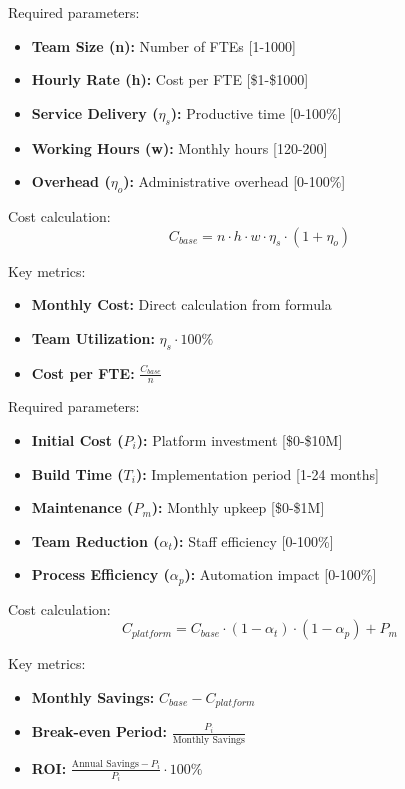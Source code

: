 \documentclass[12pt,a4paper]{article}
\newenvironment{definition}[1]
{\begin{mdframed}[style=definitionstyle,frametitle={Definition: #1}]}
{\end{mdframed}}
\begin{document}
\begin{definition}{Base Team Model Inputs}
Required parameters:
\begin{itemize}
    \item \textbf{Team Size (n):} Number of FTEs [1-1000]
    \item \textbf{Hourly Rate (h):} Cost per FTE [\$1-\$1000]
    \item \textbf{Service Delivery ($\eta_s$):} Productive time [0-100\%]
    \item \textbf{Working Hours (w):} Monthly hours [120-200]
    \item \textbf{Overhead ($\eta_o$):} Administrative overhead [0-100\%]
\end{itemize}

Cost calculation:
\begin{equation}
    C_{base} = n \cdot h \cdot w \cdot \eta_s \cdot (1 + \eta_o)
\end{equation}

Key metrics:
\begin{itemize}
    \item \textbf{Monthly Cost:} Direct calculation from formula
    \item \textbf{Team Utilization:} $\eta_s \cdot 100\%$
    \item \textbf{Cost per FTE:} $\frac{C_{base}}{n}$
\end{itemize}
\end{definition}

\begin{definition}{Team Platform Solution Inputs}
Required parameters:
\begin{itemize}
    \item \textbf{Initial Cost ($P_i$):} Platform investment [\$0-\$10M]
    \item \textbf{Build Time ($T_i$):} Implementation period [1-24 months]
    \item \textbf{Maintenance ($P_m$):} Monthly upkeep [\$0-\$1M]
    \item \textbf{Team Reduction ($\alpha_t$):} Staff efficiency [0-100\%]
    \item \textbf{Process Efficiency ($\alpha_p$):} Automation impact [0-100\%]
\end{itemize}

Cost calculation:
\begin{equation}
    C_{platform} = C_{base} \cdot (1 - \alpha_t) \cdot (1 - \alpha_p) + P_m
\end{equation}

Key metrics:
\begin{itemize}
    \item \textbf{Monthly Savings:} $C_{base} - C_{platform}$
    \item \textbf{Break-even Period:} $\frac{P_i}{\text{Monthly Savings}}$
    \item \textbf{ROI:} $\frac{\text{Annual Savings} - P_i}{P_i} \cdot 100\%$
\end{itemize}
\end{definition}
\end{document}
